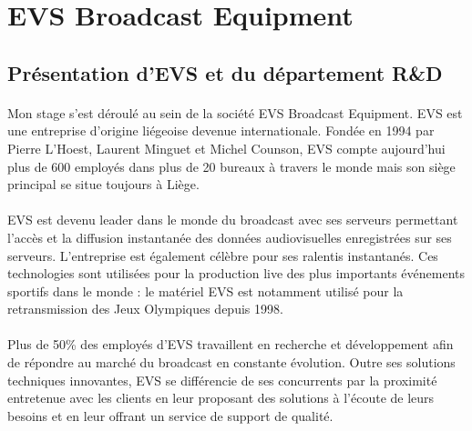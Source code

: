 \documentclass{article}
\begin{document}
    \newpage
    \section{EVS Broadcast Equipment}
    \subsection{Présentation d'EVS et du département R\&D}
    \paragraph{}
    Mon stage s'est déroulé au sein de la société EVS Broadcast Equipment. EVS est une entreprise d'origine liégeoise devenue internationale. Fondée en 1994 par Pierre L'Hoest, Laurent Minguet et Michel Counson, EVS compte aujourd'hui plus de 600 employés dans plus de 20 bureaux à travers le monde mais son siège principal se situe toujours à Liège\cite{EVS:website}.

    \paragraph{}
    EVS est devenu leader dans le monde du broadcast avec ses serveurs permettant l'accès et la diffusion instantanée des données audiovisuelles enregistrées sur ses serveurs. L'entreprise est également célèbre pour ses ralentis instantanés. Ces technologies sont utilisées pour la production live des plus importants événements sportifs dans le monde : le matériel EVS est notamment utilisé pour la retransmission des Jeux Olympiques depuis 1998.

    \paragraph{}
    Plus de 50\% des employés d'EVS travaillent en recherche et développement afin de répondre au marché du broadcast en constante évolution. Outre ses solutions techniques innovantes, EVS se différencie de ses concurrents par la proximité entretenue avec les clients en leur proposant des solutions à l'écoute de leurs besoins et en leur offrant un service de support de qualité.
\end{document}
